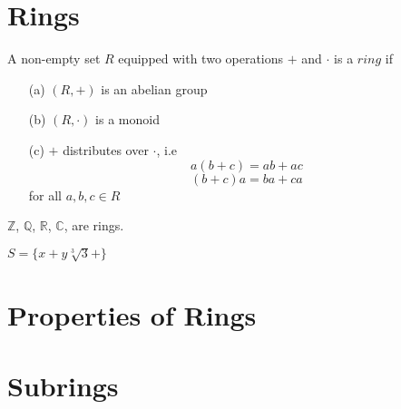 \section{Rings}

A non-empty set $R$ equipped with two operations $+$ and $\cdot$ is a $\textit{ring}$ if
\begin{itemize}
    \item[(a)]
        $(R, +)$ is an abelian group
    \item[(b)]
        $(R, \cdot)$ is a monoid
    \item[(c)]
        $+$ distributes over $\cdot$, i.e
        \[a(b+c) = ab + ac\]
        \[(b+c)a = ba + ca\]
        for all $a, b, c \in R$
\end{itemize}

\example
$\mathbb{Z}$, $\mathbb{Q}$, $\mathbb{R}$, $\mathbb{C}$, are rings.


\example $S = \{x + y\sqrt[3]{3} + \}$


\section{Properties of Rings}

\section{Subrings}
